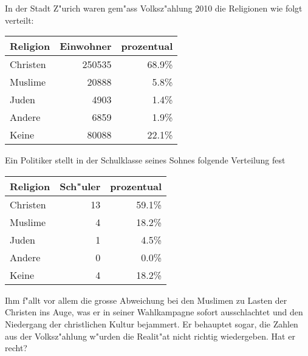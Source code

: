 In der Stadt Z"urich waren gem"ass Volksz"ahlung 2010 die Religionen
wie folgt verteilt:
\begin{center}
\begin{tabular}{|l|r|r|}
\hline
Religion&Einwohner&prozentual\\
\hline
Christen&   250535&68.9\%\\
Muslime &    20888& 5.8\%\\
Juden   &     4903& 1.4\%\\
Andere  &     6859& 1.9\%\\
Keine   &    80088&22.1\%\\
\hline
\end{tabular}
\end{center}
Ein Politiker stellt in der Schulklasse seines Sohnes folgende
Verteilung fest
\begin{center}
\begin{tabular}{|l|r|r|}
\hline
Religion&Sch"uler&prozentual\\
\hline
Christen&      13&    59.1\%\\
Muslime &       4&    18.2\%\\
Juden   &       1&     4.5\%\\
Andere  &       0&     0.0\%\\
Keine   &       4&    18.2\%\\
\hline
\end{tabular}
\end{center}
Ihm f"allt vor allem die grosse Abweichung bei den Muslimen
zu Lasten der Christen ins Auge, was er in seiner Wahlkampagne
sofort ausschlachtet und den Niedergang der christlichen Kultur
bejammert.
Er behauptet sogar, die Zahlen aus der Volksz"ahlung w"urden die
Realit"at nicht richtig wiedergeben. Hat er recht?

